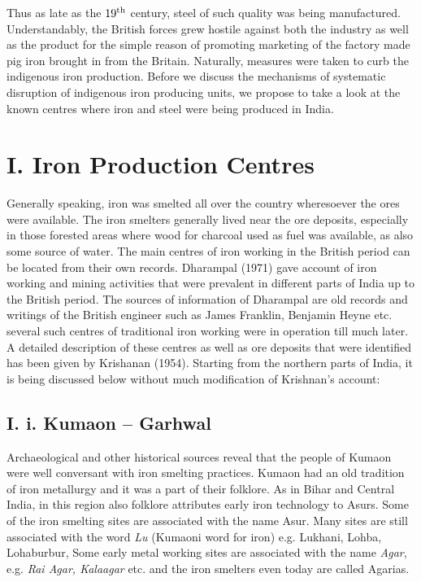 Thus as late as the $19^{\rm th}$ century, steel of such quality was being manufactured. Understandably, the British forces grew hostile against both the industry as well as the product for the simple reason of promoting marketing of the factory made pig iron brought in from the Britain. Naturally, measures were taken to curb the indigenous iron production. Before we discuss the mechanisms of systematic disruption of indigenous iron producing units, we propose to take a look at the known centres where iron and steel were being produced in India. 

\vspace{-.3cm}

\section*{I. Iron Production Centres}\label{chapter6-section-1.1}

Generally speaking, iron was smelted all over the country wheresoever the ores were available.  The iron smelters generally lived near the ore deposits, especially in those forested areas where wood for charcoal used as fuel was available, as also some source of water. The main centres of iron working in the British period can be located from their own records. Dharampal (1971) gave account of iron working and mining activities that were prevalent in different parts of India up to the British period. The sources of information of Dharampal are old records and writings of the British engineer such as James Franklin, Benjamin Heyne etc. several such centres of traditional iron working were in operation till much later. A detailed description of these centres as well as ore deposits that were identified has been given by Krishanan (1954). Starting from the northern parts of India, it is being discussed below without much modification of Krishnan’s account:


\vspace{-.3cm}

\subsection*{I. i. Kumaon – Garhwal}\label{subsection-1}

Archaeological and other historical sources reveal that the people of Kumaon were well conversant with iron smelting practices. Kumaon had an old tradition of iron metallurgy and it was a part of their folklore. As in Bihar and Central India, in this region also folklore attributes early iron technology to Asurs. Some of the iron smelting sites are associated with the name Asur. Many sites are still associated with the word {\it Lu} (Kumaoni word for iron) e.g. Lukhani, Lohba, Lohaburbur, Some early metal working sites are associated with the name {\it Agar}, e.g. {\it Rai Agar, Kalaagar} etc. and the iron smelters even today are called Agarias.

